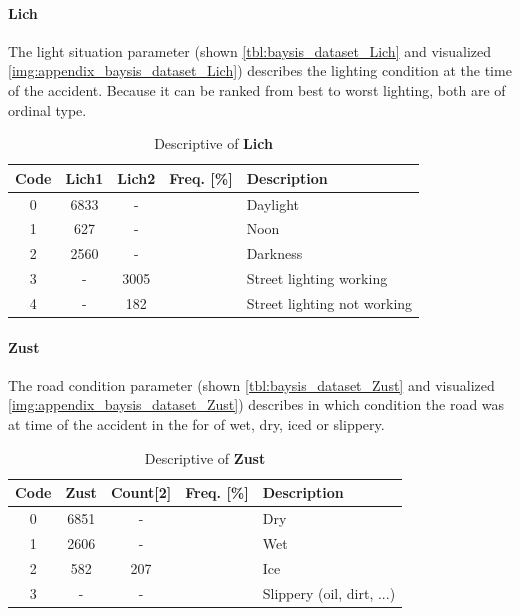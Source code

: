 \paragraph{Lich}
\label{baysis_dataset_Lich}
The light situation parameter (shown \autoref{tbl:baysis_dataset_Lich} and visualized \autoref{img:appendix_baysis_dataset_Lich}) describes the lighting condition at the time of the accident. Because it can be ranked from best to worst lighting, both are of ordinal type.
\begin{table}[ht]
	\centering
	\small
	\begin{tabular}{c|c|c|c|l}
		\toprule
		Code & \textbf{Lich1} & \textbf{Lich2} & Freq. [\%] & Description \\ 
		\midrule 
		0 & 6833 	& - 	& & Daylight \\
		1 & 627 	& -		& & Noon \\
		2 & 2560	& - 	& & Darkness \\
		3 & - 		& 3005	& & Street lighting working \\
		4 & - 		& 182	& & Street lighting not working \\
		\bottomrule
	\end{tabular}
	\caption{Descriptive of \textbf{Lich}}
	\label{tbl:baysis_dataset_Lich}
	\vspace{-8mm}
\end{table} 

\paragraph{Zust}
\label{baysis_dataset_Zust}
The road condition parameter (shown \autoref{tbl:baysis_dataset_Zust} and visualized \autoref{img:appendix_baysis_dataset_Zust}) describes in which condition the road was at time of the accident in the for of wet, dry, iced or slippery.
\begin{table}[ht]
	\centering
	\small
	\begin{tabular}{c|c|c|c|l}
		\toprule
		Code & \textbf{Zust} & Count[2] & Freq. [\%] & Description \\ 
		\midrule 
		0 & 6851 	& -		& & Dry \\ 
 		1 & 2606	& -		& & Wet \\ 
 		2 & 582		& 207	& & Ice \\
 		3 & - 		& -		& & Slippery (oil, dirt, ...)  \\
	\end{tabular}
	\caption{Descriptive of \textbf{Zust}}
	\label{tbl:baysis_dataset_Zust}
	\vspace{-8mm}
\end{table}

